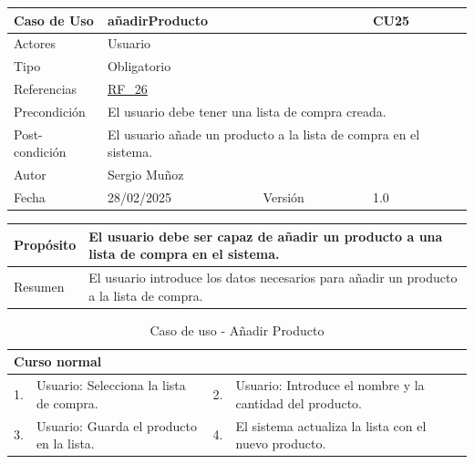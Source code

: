 \newpage

\begin{table}[H]
    \centering
    \begin{tabular}{| m{} | m{} | m{} | m{} |}
        \hline
        \rowcolor[HTML]{C0C0C0} Caso de Uso & \multicolumn{2}{|m{0.43\textwidth}|}{añadirProducto} &  CU25\\ 
        \hline
        Actores & \multicolumn{3}{l|}{Usuario} \\ 
        \hline
        Tipo & \multicolumn{3}{l|}{Obligatorio} \\ 
        \hline
        Referencias & \multicolumn{3}{l|}{\hyperref[req:RF26]{RF\_26}} \\ 
        \hline
        Precondición & \multicolumn{3}{m{0.67\textwidth}|}{El usuario debe tener una lista de compra creada.} \\ 
        \hline
        Post-condición & \multicolumn{3}{m{0.67\textwidth}|}{El usuario añade un producto a la lista de compra en el sistema.} \\ 
        \hline
        Autor & \multicolumn{3}{l|}{Sergio Muñoz} \\ 
        \hline
        Fecha & 28/02/2025 & Versión & 1.0 \\ 
        \hline
    \end{tabular}
\end{table}

\begin{table}[H]
    \centering
    \begin{tabular}{| m{} | m{} | m{} | m{} |}
        \hline
        Propósito & \multicolumn{3}{m{0.67\textwidth}|}{El usuario debe ser capaz de añadir un producto a una lista de compra en el sistema.} \\ 
        \hline
        Resumen & \multicolumn{3}{m{0.67\textwidth}|}{El usuario introduce los datos necesarios para añadir un producto a la lista de compra.} \\ 
        \hline
    \end{tabular}
\end{table}

\begin{table}[H]
    \centering
    \begin{tabular}{| m{} | m{} | m{} | m{} |}
        \hline
        \multicolumn{4}{|m{0.9\textwidth}|}{Curso normal} \\ 
        \hline
        1. & Usuario: Selecciona la lista de compra. 
        & 2. & Usuario: Introduce el nombre y la cantidad del producto. \\ 
        \hline
        3. & Usuario: Guarda el producto en la lista. 
        & 4. & El sistema actualiza la lista con el nuevo producto. \\ 
        \hline
    \end{tabular}
    \caption{Caso de uso - Añadir Producto}
\end{table}

